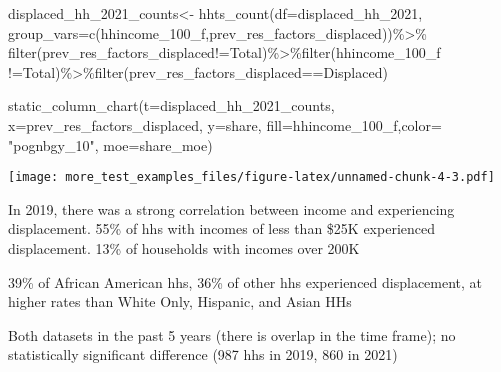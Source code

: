 \documentclass[
]{article}
\newenvironment{Shaded}{\begin{snugshade}}{\end{snugshade}}
\newcommand{\AttributeTok}[1]{\textcolor[rgb]{0.77,0.63,0.00}{#1}}
\newcommand{\FunctionTok}[1]{\textcolor[rgb]{0.00,0.00,0.00}{#1}}
\newcommand{\NormalTok}[1]{#1}
\newcommand{\OtherTok}[1]{\textcolor[rgb]{0.56,0.35,0.01}{#1}}
\newcommand{\SpecialCharTok}[1]{\textcolor[rgb]{0.00,0.00,0.00}{#1}}
\newcommand{\StringTok}[1]{\textcolor[rgb]{0.31,0.60,0.02}{#1}}
\begin{document}
\begin{Shaded}
\begin{Highlighting}[]
\NormalTok{displaced\_hh\_2021\_counts}\OtherTok{\textless{}{-}} \FunctionTok{hhts\_count}\NormalTok{(}\AttributeTok{df=}\NormalTok{displaced\_hh\_2021, }\AttributeTok{group\_vars=}\FunctionTok{c}\NormalTok{(}\StringTok{\textquotesingle{}hhincome\_100\_f\textquotesingle{}}\NormalTok{,}\StringTok{\textquotesingle{}prev\_res\_factors\_displaced\textquotesingle{}}\NormalTok{))}\SpecialCharTok{\%\textgreater{}\%}
\FunctionTok{filter}\NormalTok{(prev\_res\_factors\_displaced}\SpecialCharTok{!=}\StringTok{\textquotesingle{}Total\textquotesingle{}}\NormalTok{)}\SpecialCharTok{\%\textgreater{}\%}\FunctionTok{filter}\NormalTok{(hhincome\_100\_f }\SpecialCharTok{!=}\StringTok{\textquotesingle{}Total\textquotesingle{}}\NormalTok{)}\SpecialCharTok{\%\textgreater{}\%}\FunctionTok{filter}\NormalTok{(prev\_res\_factors\_displaced}\SpecialCharTok{==}\StringTok{\textquotesingle{}Displaced\textquotesingle{}}\NormalTok{)}

\FunctionTok{static\_column\_chart}\NormalTok{(}\AttributeTok{t=}\NormalTok{displaced\_hh\_2021\_counts, }\AttributeTok{x=}\StringTok{\textquotesingle{}prev\_res\_factors\_displaced\textquotesingle{}}\NormalTok{, }\AttributeTok{y=}\StringTok{\textquotesingle{}share\textquotesingle{}}\NormalTok{, }\AttributeTok{fill=}\StringTok{\textquotesingle{}hhincome\_100\_f\textquotesingle{}}\NormalTok{,}\AttributeTok{color=}  \StringTok{"pognbgy\_10"}\NormalTok{, }\AttributeTok{moe=}\StringTok{\textquotesingle{}share\_moe\textquotesingle{}}\NormalTok{)}
\end{Highlighting}
\end{Shaded}

\texttt{[image: more\_test\_examples\_files/figure-latex/unnamed-chunk-4-3.pdf]}

In 2019, there was a strong correlation between income and experiencing
displacement. 55\% of hhs with incomes of less than \$25K experienced
displacement. 13\% of households with incomes over 200K

39\% of African American hhs, 36\% of other hhs experienced
displacement, at higher rates than White Only, Hispanic, and Asian HHs

Both datasets in the past 5 years (there is overlap in the time frame);
no statistically significant difference (987 hhs in 2019, 860 in 2021)
\end{document}

